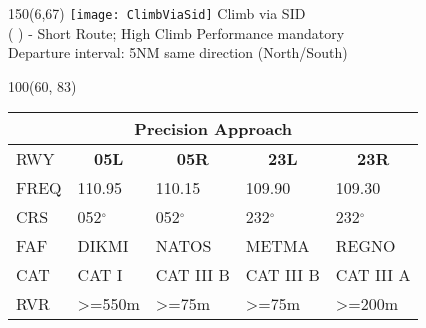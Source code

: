 \documentclass[10pt,landscape,a4paper]{article}
\begin{document}
\begin{textblock}{150}(6,67)
\noindent \texttt{[image: ClimbViaSid]} \color{red}Climb via SID \\
\color{black}( ) - Short Route; High Climb Performance mandatory \\
Departure interval: 5NM same direction (North/South)
\end{textblock}



\begin{textblock}{100}(60, 83)
\begin{table}[]
\begin{tabular}{|l|l|l|l|l|}
\multicolumn{5}{c}{\textbf{Precision Approach}} \\ \hline
RWY & \multicolumn{1}{c|}{\textbf{05L}} & \multicolumn{1}{c|}{\textbf{05R}} & \multicolumn{1}{c|}{\textbf{23L}} & \multicolumn{1}{c|}{\textbf{23R}} \\ \hline
FREQ & 110.95 & 110.15 & 109.90 & 109.30 \\
CRS & 052$^\circ$ & 052$^\circ$ & 232$^\circ$ & 232$^\circ$ \\
FAF & DIKMI & NATOS & METMA & REGNO \\
CAT & CAT I & CAT III B & CAT III B & CAT III A \\
RVR & \textgreater{}=550m & \textgreater{}=75m & \textgreater{}=75m & \textgreater{}=200m \\ \hline
\end{tabular}
\end{table}
\end{textblock}
\end{document}
